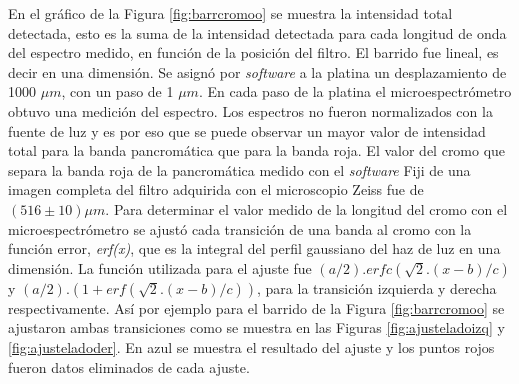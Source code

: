 En el gráfico de la Figura \ref{fig:barrcromoo} se muestra la intensidad total detectada, esto es la suma de la intensidad detectada para cada longitud de onda del espectro medido, en función de la posición del filtro. El barrido fue lineal, es decir en una dimensión. Se asignó por \textit{software} a la platina un desplazamiento de 1000 $\mu m$, con un paso de 1 $\mu m$. En cada paso de la platina el microespectrómetro obtuvo una medición del espectro. Los espectros no fueron normalizados con la fuente de luz y es por eso que se puede observar un mayor valor de intensidad total para la banda pancromática que para la banda roja. El valor del cromo que separa la banda roja de la pancromática medido con el \textit{software} Fiji de una imagen completa del filtro adquirida con el microscopio Zeiss fue de $( 516 \pm 10) \mu m$.
Para determinar el valor medido de la longitud del cromo con el microespectrómetro se ajustó cada transición de una banda al cromo con la función error, \textit{erf(x)}, que es la integral del perfil gaussiano del haz de luz en una dimensión. La función utilizada para el ajuste fue $(a/2).erfc(\sqrt{2}.(x-b)/c)$ y $(a/2).(1+erf(\sqrt{2}.(x-b)/c))$, para la transición izquierda y derecha respectivamente. Así por ejemplo para el barrido de la Figura \ref{fig:barrcromoo} se ajustaron ambas transiciones como se muestra en las Figuras \ref{fig:ajusteladoizq} y \ref{fig:ajusteladoder}. En azul se muestra el resultado del ajuste y los puntos rojos fueron datos eliminados de cada ajuste.
